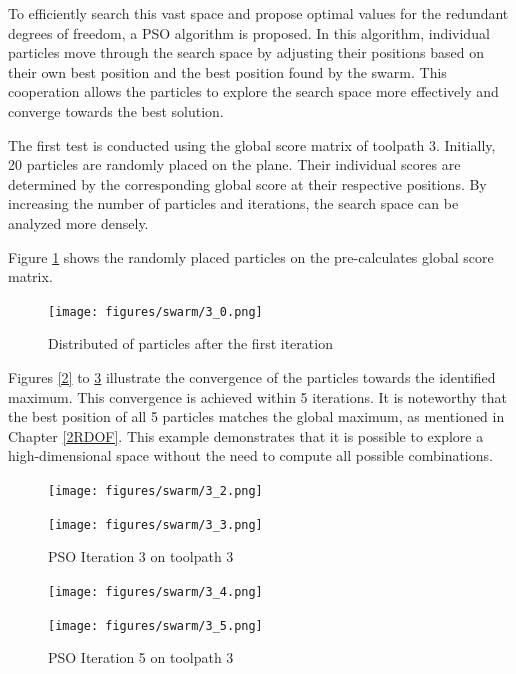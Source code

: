 To efficiently search this vast space and propose optimal values for the redundant degrees of freedom, a \acrshort{PSO} algorithm is proposed. In this algorithm, individual particles move through the search space by adjusting their positions based on their own best position and the best position found by the swarm. This cooperation allows the particles to explore the search space more effectively and converge towards the best solution.

The first test is conducted using the global score matrix of toolpath 3. Initially, 20 particles are randomly placed on the plane. Their individual scores are determined by the corresponding global score at their respective positions. By increasing the number of particles and iterations, the search space can be analyzed more densely.

Figure \ref{PSO_1} shows the randomly placed particles on the pre-calculates global score matrix.

\begin{figure}[H]
	\centerline{\texttt{[image: figures/swarm/3\_0.png]}}
	\caption{Distributed of particles after the first iteration}
	\label{PSO_1}
\end{figure}


\newpage
Figures \ref{2} to \ref{5} illustrate the convergence of the particles towards the identified maximum. This convergence is achieved within 5 iterations. It is noteworthy that the best position of all 5 particles matches the global maximum, as mentioned in Chapter \ref{2RDOF}. This example demonstrates that it is possible to explore a high-dimensional space without the need to compute all possible combinations.


\begin{figure}[H]
	\centering
	\begin{minipage}{0.5\textwidth}
		\texttt{[image: figures/swarm/3\_2.png]}
		\caption{PSO Iteration 2 on toolpath 3}
		\label{2}
	\end{minipage}\hfill
	\begin{minipage}{0.5\textwidth}
		\texttt{[image: figures/swarm/3\_3.png]}
		\caption{PSO Iteration 3 on toolpath 3}
		\label{3}
	\end{minipage}\par
\end{figure}	


\begin{figure}[H]	
		\centering
	\begin{minipage}{0.5\textwidth}
		\texttt{[image: figures/swarm/3\_4.png]}
		\caption{PSO Iteration 4 on toolpath 3}
		\label{4}
	\end{minipage}\hfill
	\begin{minipage}{0.5\textwidth}
		\texttt{[image: figures/swarm/3\_5.png]}
		\caption{PSO Iteration 5 on toolpath 3}
		\label{5}
	\end{minipage}\par
\end{figure}

